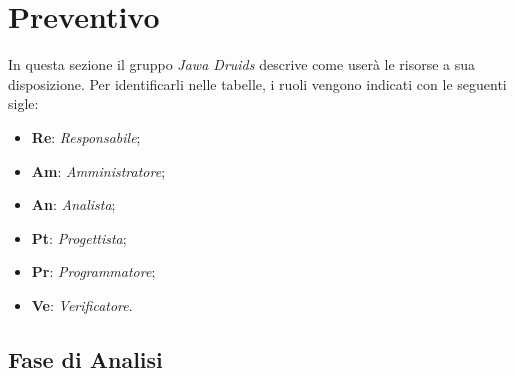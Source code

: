 \chapter{Preventivo}\label{Preventivo}

In questa sezione il gruppo \textit{Jawa Druids} descrive come userà le risorse a sua disposizione. Per identificarli nelle tabelle, i ruoli vengono indicati con le seguenti sigle:
\begin{itemize}
	\item \textbf{Re}: \textit{Responsabile};
	\item \textbf{Am}: \textit{Amministratore};
	\item \textbf{An}: \textit{Analista};
	\item \textbf{Pt}: \textit{Progettista};
	\item \textbf{Pr}: \textit{Programmatore};
	\item \textbf{Ve}: \textit{Verificatore}.
\end{itemize}

\section{Fase di Analisi}\label{PreventivoFaseDiAnalisi}

